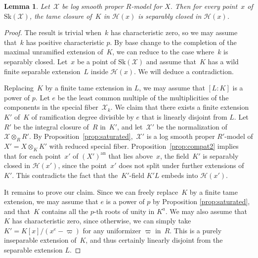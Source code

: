 \documentclass[JEP,XML,SOM,Unicode,NoFloatCountersInSection]{cedram}
\newtheorem{lemma}[equation]{Lemma}
\theoremstyle{definition}
\numberwithin{equation}{subsection}
\newcommand{\cX}{\ensuremath{\mathscr{X}}}
\newcommand{\an}{\mathrm{an}}
\newcommand{\Sk}{\mathrm{Sk}}
\let\unif\varpi
\begin{document}
\begin{lemma}\label{lemma:tame}
Let~$\cX$ be log smooth proper $R$\nobreakdash-model for $X$. Then for every point~$x$ of $\Sk(\cX)$, the tame closure of~$K$ in $\mathscr{H}(x)$ is separably closed in $\mathscr{H}(x)$.
\end{lemma}
\begin{proof}
The result is trivial when~$k$ has characteristic zero, so we may assume that~$k$ has positive characteristic $p$. By base change to the completion of the maximal unramified extension of~$K$, we can reduce to the case where~$k$ is separably closed.
Let~$x$ be a point of $\Sk(\cX)$ and assume that~$K$ has a wild finite separable extension~$L$ inside $\mathscr{H}(x)$. We will deduce a contradiction.

Replacing~$K$ by a finite tame extension in $L$, we may assume that $[L\colon K]$ is a power of $p$. Let $e$ be the least common multiple of the multiplicities of the components in the special fiber~$\cX_k$. We claim that there exists a finite extension~$K'$ of~$K$ of ramification degree divisible by $e$ that is linearly disjoint from $L$.
Let $R'$ be the integral closure of~$R$ in~$K'$, and let~$\cX'$ be the normalization of $\cX\otimes_R R'$. By Proposition~\ref{prop:saturated},~$\cX'$ is a log smooth proper $R'$-model of $X'=X\otimes_K K'$ with reduced special fiber.
Proposition~\ref{prop:compat2} implies that for each point~$x'$ of $(X')^{\an}$ that lies above~$x$, the field~$K'$ is separably closed in $\mathscr{H}(x')$, since the point~$x'$ does not split under further extensions of~$K'$. This contradicts the fact that the~$K'$-field $K'L$ embeds into $\mathscr{H}(x')$.

It remains to prove our claim. Since we can freely replace~$K$ by a finite tame extension, we may assume that $e$ is a power of $p$ by Proposition \ref{prop:saturated}, and that~$K$ contains all the $p$-th roots of unity in $K^a$. We may also assume that~$K$ has characteristic zero, since otherwise, we can simply take $K'=K[x]/(x^e-\unif)$ for any uniformizer $\unif$ in~$R$. This is a purely inseparable extension of~$K$, and thus certainly linearly disjoint from
the separable extension $L$.


\end{proof}
\end{document}
